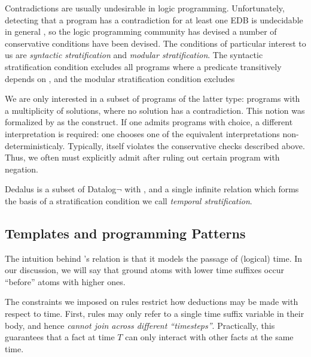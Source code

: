 Contradictions are usually undesirable in logic programming.  Unfortunately, detecting that a program has a contradiction for at least one EDB is undecidable in general , so the logic programming community has devised a number of conservative conditions have been devised.  The conditions of particular interest to us are {\em syntactic stratification} and {\em modular stratification}.  The syntactic stratification condition excludes all programs where a predicate  transitively depends on , and the modular stratification condition excludes 


We are only interested in a subset of programs of the latter type: programs with a multiplicity of solutions, where no solution has a contradiction.  This notion was formalized by  as the  construct.  If one admits programs with choice, a different interpretation is required: one chooses one of the equivalent interpretations non-deterministicaly.  Typically,  itself violates the conservative checks described above.  Thus, we often must explicitly admit  after ruling out certain program with negation.


Dedalus is a subset of Datalog$\lnot$ with , and a single infinite relation  which forms the basis of a stratification condition we call {\em temporal stratification}.  


\subsection{Templates and programming Patterns}

The intuition behind \lang's  relation is that it models the
passage of (logical) time.  In our discussion, we will say that ground atoms
with lower time suffixes occur ``before'' atoms with higher ones.

The constraints we imposed on \slang rules restrict how deductions may be made
with respect to time.  First, rules may only refer to a single time suffix variable in
their body, and hence {\em cannot join across different ``timesteps''}.  Practically, this guarantees that a fact at time $T$ can only interact with other facts at the same time.

